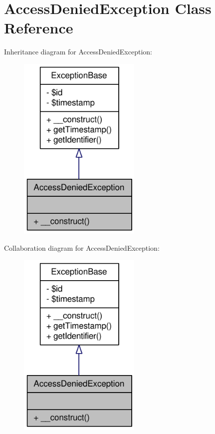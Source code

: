 \hypertarget{classAccessDeniedException}{
\section{AccessDeniedException Class Reference}
\label{classAccessDeniedException}
}


Inheritance diagram for AccessDeniedException:\nopagebreak
\begin{figure}[H]
\begin{center}
\leavevmode
\includegraphics[width=166pt]{classAccessDeniedException__inherit__graph}
\end{center}
\end{figure}


Collaboration diagram for AccessDeniedException:\nopagebreak
\begin{figure}[H]
\begin{center}
\leavevmode
\includegraphics[width=166pt]{classAccessDeniedException__coll__graph}
\end{center}
\end{figure}
